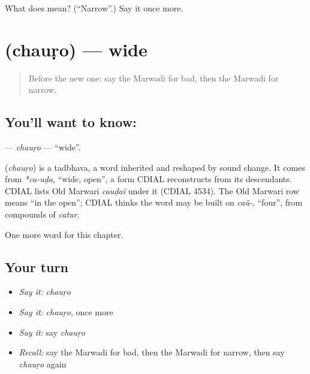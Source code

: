 \begin{tcolorbox}[breakable,colback=teal!4,colframe=teal!35!black,title={Before you move on}]
What does  mean? (\textquotedblleft{}Narrow\textquotedblright{}.) Say it once more.
\end{tcolorbox}
\section[\texorpdfstring{\mw{चौड़ो} (chauṛo)}{चौड़ो (chauṛo)}]{ (chauṛo) — wide}

\label{lesson:MW-C141-chauro}



\begin{quote}
Before the new one: say the Marwadi for bad, then the Marwadi for narrow.
\end{quote}

\subsection*{You'll want to know: }
\textbf{} — \emph{chauṛo} — \textquotedblleft{}wide\textquotedblright{}.

\begin{cousinweb}
\textbf{} (\emph{chauṛo}) is a tadbhava, a word inherited and reshaped by sound change. It comes from \emph{*ca-uḍa}, \textquotedblleft{}wide, open\textquotedblright{}, a form CDIAL reconstructs from its descendants. CDIAL lists Old Marwari \emph{cauḍaï} under it (CDIAL 4534). The Old Marwari row means \textquotedblleft{}in the open\textquotedblright{}; CDIAL thinks the word may be built on \emph{caü-}, \textquotedblleft{}four\textquotedblright{}, from compounds of \emph{catur}.
\end{cousinweb}

\begin{grammarlens}[title={What you've built}]
One more word for this chapter.
\end{grammarlens}

\subsection*{Your turn}
\begin{itemize}
\raggedright
  \item \emph{Say it:} \emph{chauṛo}
  \item \emph{Say it:} \emph{chauṛo}, once more
  \item \emph{Say it:} say \emph{chauṛo}
  \item \emph{Recall:} say the Marwadi for bad, then the Marwadi for narrow, then say \emph{chauṛo} again
\end{itemize}

